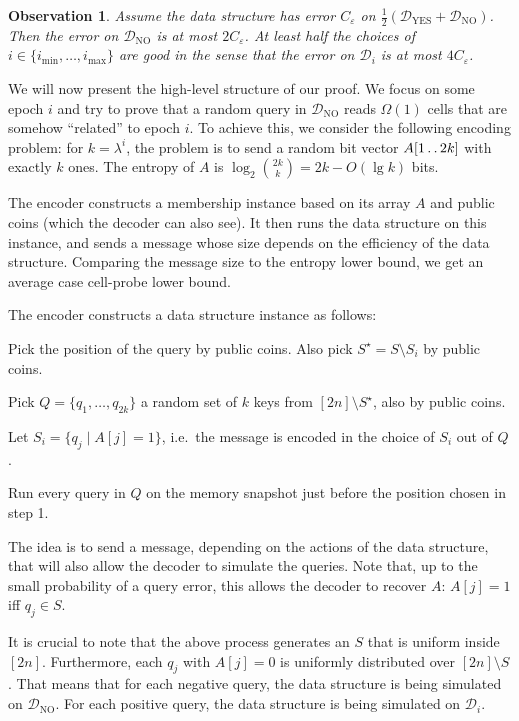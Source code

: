 \documentclass[letterpaper,11pt]{article}
\newenvironment{itemize*}{\vspace{-1ex}\begin{itemize}\setlength{\itemsep}{-0.5ex}\setlength{\parsep}{0pt}}{\end{itemize}}
\newtheorem{observation}[theorem]{Observation}
\newcommand{\eps}{\varepsilon}
\newcommand{\twodots}{\mathinner{\ldotp\ldotp}}
\newcommand{\calD}{\mathcal{D}}
\newcommand{\Dyes}{\calD_{\mathrm{YES}}}
\newcommand{\Dno}{\calD_{\mathrm{NO}}}
\newcommand{\imax}{{i_{\max}}}
\newcommand{\imin}{{i_{\min}}}
\begin{document}
\begin{observation}
Assume the data structure has error $C_\eps$ on $\frac{1}{2} (\Dyes +
\Dno)$. Then the error on $\Dno$ is at most $2C_\eps$. At least half
the choices of $i \in \{ \imin, \dots, \imax \}$ are \emph{good} in the
sense that the error on $\calD_i$ is at most $4 C_\eps$.
\end{observation}

We will now present the high-level structure of our proof. We focus on
some epoch $i$ and try to prove that a random query in $\Dno$ reads
$\Omega(1)$ cells that are somehow ``related'' to epoch $i$.  To
achieve this, we consider the following encoding problem: for $k =
\lambda^i$, the problem is to send a random bit vector $A[1\twodots
  2k]$ with exactly $k$ ones. The entropy of $A$ is $\log_2
\binom{2k}{k} = 2k - O(\lg k)$ bits.

The encoder constructs a membership instance based on its array $A$
and public coins (which the decoder can also see). It then runs the
data structure on this instance, and sends a message whose size
depends on the efficiency of the data structure. Comparing the message
size to the entropy lower bound, we get an average case cell-probe
lower bound.

The encoder constructs a data structure instance as follows:
\begin{itemize*}
\item Pick the position of the query by public coins. Also pick
  $S^\star = S \setminus S_i$ by public coins.

\item Pick $Q = \{ q_1, \dots, q_{2k} \}$ a random set of $k$ keys
  from $[2n] \setminus S^\star$, also by public coins.

\item Let $S_i = \{ q_j \mid A[j] = 1\}$, i.e.~the message is encoded
  in the choice of $S_i$ out of $Q$.

\item Run every query in $Q$ on the memory snapshot just before the
  position chosen in step 1.
\end{itemize*}

The idea is to send a message, depending on the actions of the data
structure, that will also allow the decoder to simulate the
queries. Note that, up to the small probability of a query error, this
allows the decoder to recover $A$: $A[j]=1$ iff $q_j \in S$.

It is crucial to note that the above process generates an $S$ that is
uniform inside $[2n]$. Furthermore, each $q_j$ with $A[j]=0$ is
uniformly distributed over $[2n] \setminus S$. That means that for
each negative query, the data structure is being simulated on
$\Dno$. For each positive query, the data structure is being simulated
on $\calD_i$.
\end{document}
